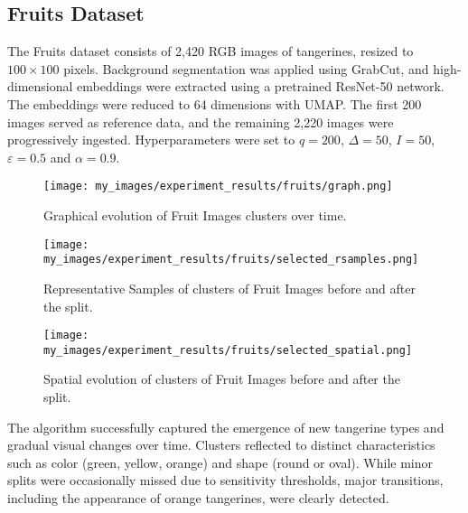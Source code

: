 
\subsection{Fruits Dataset}\label{subsec:fruits}

The Fruits dataset consists of 2,420 RGB images of tangerines, resized to $100
    \times 100$ pixels. Background segmentation was applied using GrabCut, and
high-dimensional embeddings were extracted using a pretrained ResNet-50
network. The embeddings were reduced to 64 dimensions with UMAP.
The first 200 images served as reference data, and the remaining 2,220 images
were progressively ingested. Hyperparameters were set to $q=200$, $\Delta=50$,
$I=50$, $\varepsilon=0.5$ and $\alpha=0.9$.

\begin{figure}[H]
    \centering
    \texttt{[image: my\_images/experiment\_results/fruits/graph.png]}
    \caption{Graphical evolution of Fruit Images clusters over time.}
\end{figure}

\begin{figure}[H]
    \centering
    \texttt{[image: my\_images/experiment\_results/fruits/selected\_rsamples.png]}
    \caption{Representative Samples of clusters of Fruit Images before and after the split.}
\end{figure}

\begin{figure}[H]
    \centering
    \texttt{[image: my\_images/experiment\_results/fruits/selected\_spatial.png]}
    \caption{Spatial evolution of clusters of Fruit Images before and after the split.}
\end{figure}

The algorithm successfully captured the emergence of new tangerine types and
gradual visual changes over time. Clusters reflected to distinct
characteristics such as color (green, yellow, orange) and shape (round or
oval). While minor splits were occasionally missed due to sensitivity
thresholds, major transitions, including the appearance of orange tangerines,
were clearly detected.
